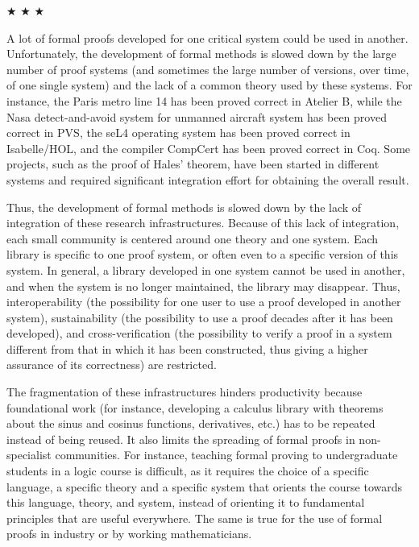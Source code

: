 \begin{center}
  
$\bigstar$ $\bigstar$ $\bigstar$

\end{center}

A lot of formal proofs developed for one critical system could be used
in another.  Unfortunately, the development of formal methods is
slowed down by the large number of proof systems (and sometimes the
large number of versions, over time, of one single system) and the
lack of a common theory used by these systems.  For instance, the
Paris metro line 14 has been proved correct in Atelier B, while the
Nasa detect-and-avoid system for unmanned aircraft system has been
proved correct in PVS, the seL4 operating system has been proved
correct in Isabelle/HOL, and the compiler CompCert has been proved
correct in Coq.  Some projects, such as the proof of Hales' theorem,
have been started in different systems and required significant
integration effort for obtaining the overall result.

Thus, the development of formal methods is slowed down by the lack of
integration of these research infrastructures.  Because of this lack
of integration, each small community is centered around one theory and
one system. Each library is specific to one proof system, or often
even to a specific version of this system. In general, a library
developed in one system cannot be used in another, and when the system
is no longer maintained, the library may disappear.  Thus,
interoperability (the possibility for one user to use a proof
developed in another system), sustainability (the possibility to use a
proof decades after it has been developed), and cross-verification
(the possibility to verify a proof in a system different from that in
which it has been constructed, thus giving a higher assurance of its
correctness) are restricted.

The fragmentation of these infrastructures hinders productivity
because foundational work (for instance, developing a calculus library
with theorems about the sinus and cosinus functions, derivatives,
etc.) has to be repeated instead of being reused.  It also limits the
spreading of formal proofs in non-specialist communities. For
instance, teaching formal proving to undergraduate students in a logic
course is difficult, as it requires the choice of a specific language,
a specific theory and a specific system that orients the course
towards this language, theory, and system, instead of orienting it to
fundamental principles that are useful everywhere. The same is true
for the use of formal proofs in industry or by working mathematicians.

